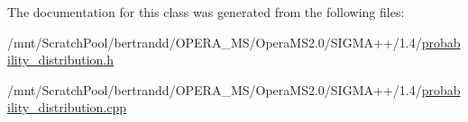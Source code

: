 The documentation for this class was generated from the following files:\begin{DoxyCompactItemize}
\item 
/mnt/ScratchPool/bertrandd/OPERA\_\-MS/OperaMS2.0/SIGMA++/1.4/\hyperlink{probability__distribution_8h}{probability\_\-distribution.h}\item 
/mnt/ScratchPool/bertrandd/OPERA\_\-MS/OperaMS2.0/SIGMA++/1.4/\hyperlink{probability__distribution_8cpp}{probability\_\-distribution.cpp}\end{DoxyCompactItemize}
